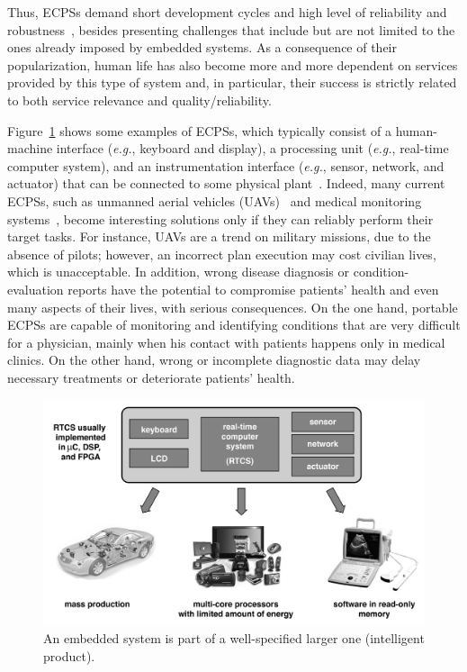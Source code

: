 \documentclass[format=acmsmall, review=false, screen=true]{acmart}
\begin{document}
Thus, ECPSs demand short development cycles and high level of reliability and robustness~\cite{leeCPS,leeCPS2}, besides presenting challenges that include but are not limited to the ones already imposed by embedded systems. As a consequence of their popularization, human life has also become more and more dependent on services provided by this type of system and, in particular, their success is strictly related to both service relevance and quality/reliability. 

Figure~\ref{intelligent-product} shows some examples of ECPSs, which typically consist of a human-machine interface ({\it e.g.}, keyboard and display), a processing unit ({\it e.g.}, real-time computer system), and an instrumentation interface ({\it e.g.}, sensor, network, and actuator) that can be connected to some physical plant~\cite{Kopetz11}. Indeed, many current ECPSs, such as unmanned aerial vehicles (UAVs)~\cite{groza2015formal} and medical monitoring systems~\cite{Cordeiro09}, become interesting solutions only if they can reliably perform their target tasks. For instance, UAVs are a trend on military missions, due to the absence of pilots; however, an incorrect plan execution may cost civilian lives, which is unacceptable. In addition, wrong disease diagnosis or condition-evaluation reports have the potential to compromise patients' health and even many aspects of their lives, with serious consequences. On the one hand, portable ECPSs are capable of monitoring and identifying conditions that are very difficult for a physician, mainly when his contact with patients happens only in medical clinics. On the other hand, wrong or incomplete diagnostic data may delay necessary treatments or deteriorate patients' health. 
%
\begin{figure}[!t]
	\centering
	\includegraphics[scale=0.4]{figure1.jpg}
	\caption{An embedded system is part of a well-specified larger one (intelligent product).}
	\label{intelligent-product}
\end{figure}
\end{document}
